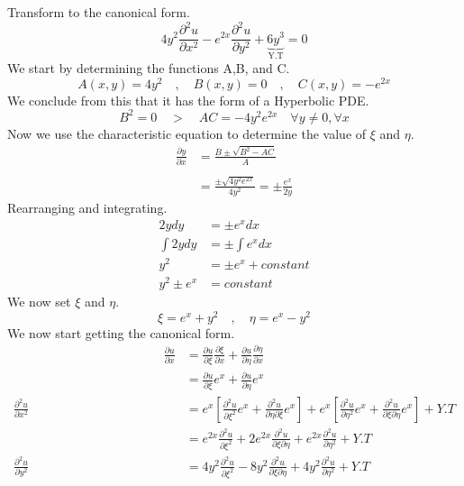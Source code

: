 \documentclass[]{article}
\begin{document}
\begin{example}
    Transform to the canonical form.
    \[
        4y^2\frac{\partial^2 u}{\partial x^2}-e^{2x}\frac{\partial^2 u}{\partial y^2}+\underbrace{6y^3}_{\text{Y.T}} = 0    
    \]
    We start by determining the functions A,B, and C.
    \[
        A\left(x,y\right)=4y^2 \quad,\quad B\left(x,y\right)=0 \quad,\quad C\left(x,y\right)=-e^{2x}    
    \]
    We conclude from this that it has the form of a Hyperbolic PDE.
    \[
        B^2 =0 \quad>\quad AC=-4y^2e^{2x} \quad \forall y\neq0 , \forall x    
    \]
    Now we use the characteristic equation to determine the value of $\xi$ and $\eta$.
    \begin{align*}
        \frac{\partial y}{\partial x} &= \frac{B\pm\sqrt{B^2 -AC}}{A}\\
        \\
        &= \frac{\pm\sqrt{4y^2 e^{2x}}}{4y^2}=\pm\frac{e^x}{2y}
    \end{align*}
    Rearranging and integrating.
    \begin{align*}
        2ydy &= \pm e^x dx
        \\
        \int 2ydy &= \pm \int e^x dx
        \\
        y^2 &= \pm e^x + constant
        \\
        y^2 \pm e^x &= constant 
    \end{align*}
    We now set $\xi$ and $\eta$.
    \[
        \xi = e^x + y^2 \quad , \quad \eta = e^x - y^2    
    \]
    We now start getting the canonical form.
    \begin{align*}
        \hspace{5cm}
        \frac{\partial u}{\partial x} &= \frac{\partial u}{\partial\xi}\frac{\partial\xi}{\partial x} + \frac{\partial u }{\partial\eta}\frac{\partial\eta}{\partial x}
        \\
        &= \frac{\partial u}{\partial\xi}e^x+\frac{\partial u}{\partial\eta}e^x
        \\
        \frac{\partial^2 u}{\partial x^2} &= e^x\left[\frac{\partial^2 u}{\partial\xi^2} e^x + \frac{\partial^2 u}{\partial\eta\partial\xi}e^x\right]+e^x\left[\frac{\partial^2 u}{\partial\eta^2} e^x + \frac{\partial^2 u}{\partial\xi\partial\eta}e^x\right]+Y.T
        \\
        &= e^{2x}\frac{\partial^2 u}{\partial\xi^2}+2e^{2x}\frac{\partial^2 u}{\partial\xi\partial\eta}+e^{2x}\frac{\partial^2 u}{\partial\eta^2}+Y.T
        \\
        \frac{\partial^2 u}{\partial y^2} &= 4y^2\frac{\partial^2 u}{\partial\xi^2}-8y^2\frac{\partial^2 u}{\partial\xi\partial\eta}+4y^2\frac{\partial^2 u}{\partial\eta^2}+Y.T

\end{align*}
\end{example}
\end{document}
